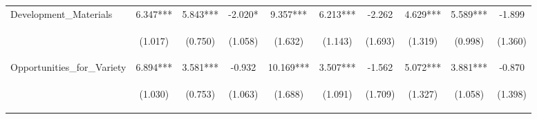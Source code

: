 \begin{tabular}{lccccccccc}
\noalign{\smallskip}Development_Materials & 6.347*** & 5.843*** & -2.020* & 9.357*** & 6.213*** & -2.262 & 4.629*** & 5.589*** & -1.899\\
 & \begin{footnotesize}(1.017)\end{footnotesize} & \begin{footnotesize}(0.750)\end{footnotesize} & \begin{footnotesize}(1.058)\end{footnotesize} & \begin{footnotesize}(1.632)\end{footnotesize} & \begin{footnotesize}(1.143)\end{footnotesize} & \begin{footnotesize}(1.693)\end{footnotesize} & \begin{footnotesize}(1.319)\end{footnotesize} & \begin{footnotesize}(0.998)\end{footnotesize} & \begin{footnotesize}(1.360)\end{footnotesize}\\
\noalign{\smallskip}Opportunities_for_Variety & 6.894*** & 3.581*** & -0.932 & 10.169*** & 3.507*** & -1.562 & 5.072*** & 3.881*** & -0.870\\
 & \begin{footnotesize}(1.030)\end{footnotesize} & \begin{footnotesize}(0.753)\end{footnotesize} & \begin{footnotesize}(1.063)\end{footnotesize} & \begin{footnotesize}(1.688)\end{footnotesize} & \begin{footnotesize}(1.091)\end{footnotesize} & \begin{footnotesize}(1.709)\end{footnotesize} & \begin{footnotesize}(1.327)\end{footnotesize} & \begin{footnotesize}(1.058)\end{footnotesize} & \begin{footnotesize}(1.398)\end{footnotesize}\\

\end{tabular}
